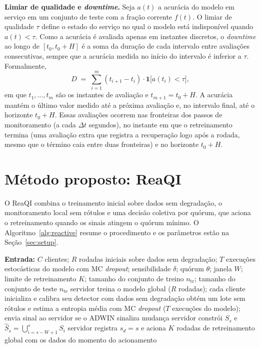 \documentclass[conference]{IEEEtran}
\begin{document}
\textbf{Limiar de qualidade e \textit{downtime}.} Seja $a(t)$ a acurácia do modelo em serviço em um conjunto de teste com a fração corrente $f(t)$. O limiar de qualidade $\tau$ define o estado do serviço no qual o modelo está indisponível quando $a(t)<\tau$. Como a acurácia é avaliada apenas em instantes discretos, o \textit{downtime} ao longo de $[t_0,t_0+H]$ é a soma da duração de cada intervalo entre avaliações consecutivas, sempre que a acurácia medida no início do intervalo é inferior a $\tau$. Formalmente,
\begin{equation}
D \;=\; \sum_{i=1}^{m} (t_{i+1}-t_i)\cdot
\mathbf{1}\big[a(t_i)<\tau\big] ,
\label{eq:downtime}
\end{equation}
em que $t_1,\dots,t_m$ são os instantes de avaliação e $t_{m+1}=t_0+H$. A acurácia mantém o último valor medido até a próxima avaliação e, no intervalo final, até o horizonte $t_0+H$. Essas avaliações ocorrem nas fronteiras dos passos de monitoramento (a cada $\Delta t$ segundos), no instante em que o retreinamento termina (uma avaliação extra que registra a recuperação logo após a rodada, mesmo que o término caia entre duas fronteiras) e no horizonte $t_0+H$.

\section{Método proposto: ReaQI}
O ReaQI combina o treinamento inicial sobre dados sem degradação, o monitoramento local sem rótulos e uma decisão coletiva por quórum, que aciona o retreinamento quando os sinais atingem o quórum mínimo. O Algoritmo~\ref{alg:reactive} resume o procedimento e os parâmetros estão na Seção~\ref{sec:setup}.

\begin{algorithm}[!bh]
\footnotesize
\caption{ReaQI: retreinamento reativo com detecção local por incerteza e decisão coletiva por quórum.}
\label{alg:reactive}
\begin{algorithmic}[1]
\State \textbf{Entrada:} $C$ clientes; $R$ rodadas iniciais sobre dados sem degradação; $T$ execuções estocásticas do modelo com MC \textit{dropout}; sensibilidade $\delta$; quórum $\theta$; janela $W$; limite de retreinamento $K$; tamanho do conjunto de treino $n_{\mathrm{tr}}$; tamanho do conjunto de teste $n_{\mathrm{te}}$
\State servidor treina o modelo global ($R$ rodadas); cada cliente inicializa e calibra seu detector com dados sem degradação
     \State obtém um lote sem rótulos e estima a entropia média com MC \textit{dropout} ($T$ execuções do modelo); envia sinal ao servidor se o ADWIN sinaliza mudança
  \EndFor
  \State servidor constrói $S_s$ e $\hat{S}_s = \bigcup_{i=s-W+1}^{s} S_i$
     \State servidor registra $s_d=s$ e aciona $K$ rodadas de retreinamento global com os dados do momento do acionamento
  \EndIf
\EndWhile
\end{algorithmic}
\end{algorithm}
\end{document}
